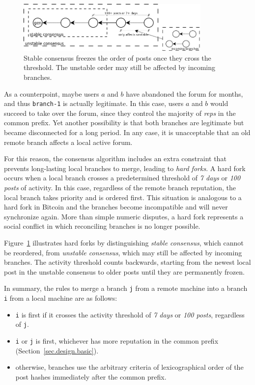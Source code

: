 \documentclass[12pt]{article}
\newcommand{\reps}     {\emph{reps}\xspace}
\newcommand{\code}[1]  {\texttt{\footnotesize{#1}}}
\begin{document}
\begin{figure}
\centering
\includegraphics[width=0.85\textwidth]{n100-d7.png}
\caption{
    Stable consensus freezes the order of posts once they cross the threshold.
    The unstable order may still be affected by incoming branches.
}
\label{fig.hard}
\end{figure}

As a counterpoint, maybe users $a$ and $b$ have abandoned the forum for months,
and thus \code{branch-1} is actually legitimate.
In this case, users $a$ and $b$ would succeed to take over the
forum, since they control the majority of \reps in the common
prefix.
Yet another possibility is that both branches are legitimate but became
disconnected for a long period.
In any case, it is unacceptable that an old remote branch affects a local
active forum.

For this reason, the consensus algorithm includes an extra constraint that
prevents long-lasting local branches to merge, leading to \emph{hard forks}.
A hard fork occurs when a local branch crosses a predetermined
threshold of \emph{7 days} or \emph{100 posts} of activity.
In this case, regardless of the remote branch reputation, the local branch
takes priority and is ordered first.
This situation is analogous to a hard fork in Bitcoin and the branches become
incompatible and will never synchronize again.
More than simple numeric disputes, a hard fork represents a social conflict in
which reconciling branches is no longer possible.

Figure~\ref{fig.hard} illustrates hard forks by distinguishing \emph{stable
consensus}, which cannot be reordered, from \emph{unstable consensus}, which
may still be affected by incoming branches.
The activity threshold counts backwards, starting from the newest local post
in the unstable consensus to older posts until they are permanently frozen.

In summary, the rules to merge a branch \code{j} from a remote machine into a
branch \code{i} from a local machine are as follows:
\begin{itemize}
    \item \code{i} is first if it crosses the activity threshold of
          \emph{7 days} or \emph{100 posts}, regardless of \code{j}.
    \item \code{i} or \code{j} is first, whichever has more reputation in the
          common prefix (Section~\ref{sec.design.basic}).
    \item otherwise, branches use the arbitrary criteria of lexicographical
          order of the post hashes immediately after the common prefix.
\end{itemize}
\end{document}
